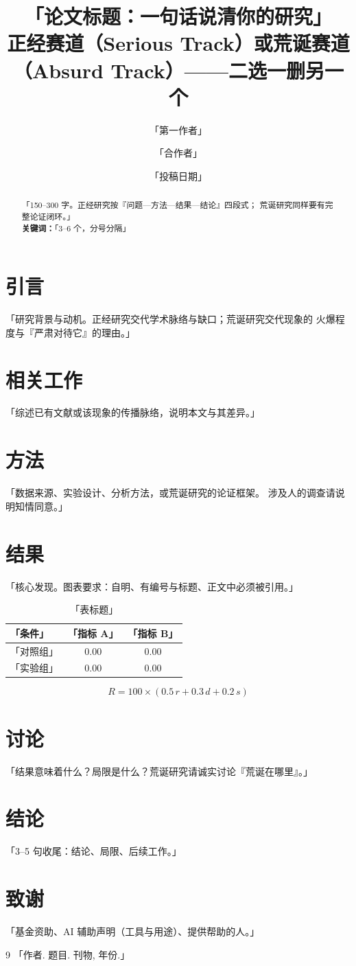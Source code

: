 \documentclass[12pt,a4paper]{article}
\title{\textbf{「论文标题：一句话说清你的研究」}\\
{\large 正经赛道（Serious Track）或荒诞赛道（Absurd Track）——二选一删另一个}}
\author{「第一作者」\and 「合作者」}
\date{「投稿日期」}
\begin{document}
\maketitle

\begin{abstract}
「150--300 字。正经研究按『问题---方法---结果---结论』四段式；
荒诞研究同样要有完整论证闭环。」\\[1em]
\textbf{关键词：}「3--6 个，分号分隔」
\end{abstract}

\section{引言}
「研究背景与动机。正经研究交代学术脉络与缺口；荒诞研究交代现象的
火爆程度与『严肃对待它』的理由。」

\section{相关工作}
「综述已有文献或该现象的传播脉络，说明本文与其差异。」

\section{方法}
「数据来源、实验设计、分析方法，或荒诞研究的论证框架。
涉及人的调查请说明知情同意。」

\section{结果}
「核心发现。图表要求：自明、有编号与标题、正文中必须被引用。」

\begin{table}[htbp]
\centering
\caption{「表标题」}
\begin{tabular}{lcc}
\toprule
「条件」 & 「指标 A」 & 「指标 B」 \\
\midrule
「对照组」 & 0.00 & 0.00 \\
「实验组」 & 0.00 & 0.00 \\
\bottomrule
\end{tabular}
\end{table}

\begin{equation}
R = 100 \times \left( 0.5\,r + 0.3\,d + 0.2\,s \right)
\end{equation}

\section{讨论}
「结果意味着什么？局限是什么？荒诞研究请诚实讨论『荒诞在哪里』。」

\section{结论}
「3--5 句收尾：结论、局限、后续工作。」

\section*{致谢}
「基金资助、AI 辅助声明（工具与用途）、提供帮助的人。」

\begin{thebibliography}{9}
 「作者. 题目. 刊物, 年份.」
\end{thebibliography}
\end{document}
